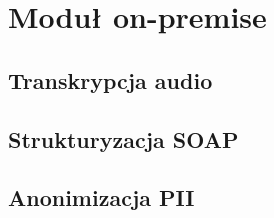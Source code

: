 \section{Moduł on-premise}\label{sec:impl-on-premise}

\subsection{Transkrypcja audio}\label{sec:stt-impl}

%
%
%
%
%

\subsection{Strukturyzacja SOAP}\label{sec:slm-impl}

%

\subsection{Anonimizacja PII}\label{sec:presidio-impl}

%
%
%
%

